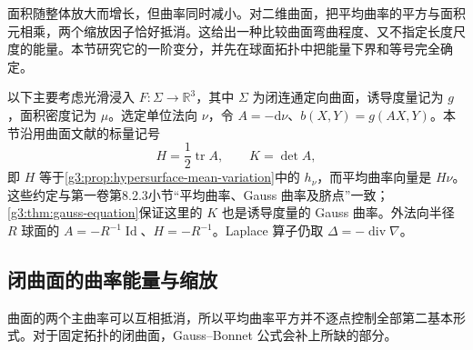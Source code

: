 
% 
% 
% 
% 


面积随整体放大而增长，但曲率同时减小。对二维曲面，把平均曲率的平方与面积元相乘，两个缩放因子恰好抵消。这给出一种比较曲面弯曲程度、又不指定长度尺度的能量。本节研究它的一阶变分，并先在球面拓扑中把能量下界和等号完全确定。

\ProseParagraphBreak

以下主要考虑光滑浸入 \(F:\Sigma\to\mathbb R^3\)，其中 \(\Sigma\) 为闭连通定向曲面，诱导度量记为 \(g\)，面积密度记为 \(\mu\)。选定单位法向 \(\nu\)，令 \(A=-\mathrm d\nu\)、\(b(X,Y)=g(AX,Y)\)。本节沿用曲面文献的标量记号
\[
	H=\frac12\operatorname{tr}A,\qquad K=\det A,
\]
即 \(H\) 等于\cref{g3:prop:hypersurface-mean-variation}中的 \(h_\nu\)，而平均曲率向量是 \(H\nu\)。这些约定与第一卷第8.2.3小节“平均曲率、Gauss 曲率及脐点”一致；\cref{g3:thm:gauss-equation}保证这里的 \(K\) 也是诱导度量的 Gauss 曲率。外法向半径 \(R\) 球面的 \(A=-R^{-1}\operatorname{Id}\)、\(H=-R^{-1}\)。Laplace 算子仍取 \(\Delta=-\operatorname{div}\nabla\)。

\subsection{闭曲面的曲率能量与缩放}
\label{g3:subsec:1906:01}
曲面的两个主曲率可以互相抵消，所以平均曲率平方并不逐点控制全部第二基本形式。对于固定拓扑的闭曲面，Gauss--Bonnet 公式会补上所缺的部分。

